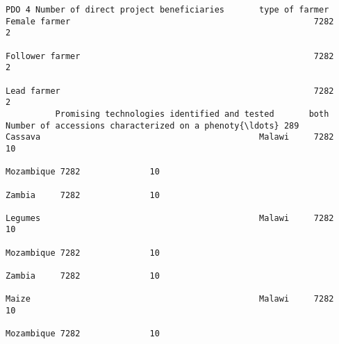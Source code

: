 \documentclass[11pt]{article}
\begin{document}
\begin{Verbatim}[commandchars=\\\{\}]
                                                                         PDO 4 Number of direct project beneficiaries       type of farmer                    Female farmer                                                 7282               2  
                                                                                                                                                              Follower farmer                                               7282               2  
                                                                                                                                                              Lead farmer                                                   7282               2  
          Promising technologies identified and tested       both        Number of accessions characterized on a phenoty{\ldots} 289                               Cassava                                            Malawi     7282              10  
                                                                                                                                                                                                                 Mozambique 7282              10  
                                                                                                                                                                                                                 Zambia     7282              10  
                                                                                                                                                              Legumes                                            Malawi     7282              10  
                                                                                                                                                                                                                 Mozambique 7282              10  
                                                                                                                                                                                                                 Zambia     7282              10  
                                                                                                                                                              Maize                                              Malawi     7282              10  
                                                                                                                                                                                                                 Mozambique 7282              10  

\end{Verbatim}
\end{document}
